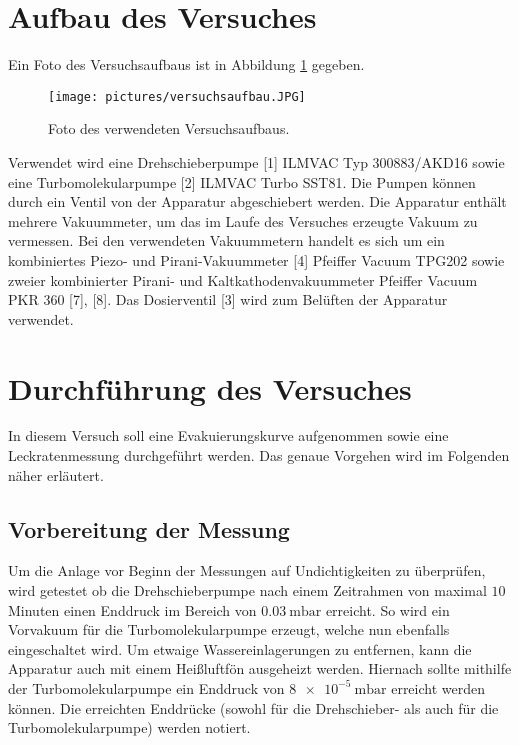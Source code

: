 \section{Aufbau des Versuches}
\label{sec:aufbau}
Ein Foto des Versuchsaufbaus ist in Abbildung \ref{fig:versuchsaufbau} gegeben.
\begin{figure}[H]
  \centering
  \caption{Foto des verwendeten Versuchsaufbaus.}
  \label{fig:versuchsaufbau}
  \texttt{[image: pictures/versuchsaufbau.JPG]}
\end{figure}
\noindent
Verwendet wird eine Drehschieberpumpe [1] ILMVAC Typ 300883/AKD16 sowie eine Turbomolekularpumpe [2]
ILMVAC Turbo SST81. Die Pumpen können durch ein Ventil von der Apparatur abgeschiebert werden.
Die Apparatur enthält mehrere Vakuummeter, um das im Laufe des Versuches erzeugte Vakuum zu vermessen.
Bei den verwendeten Vakuummetern handelt es sich um ein kombiniertes
Piezo- und Pirani-Vakuummeter [4] Pfeiffer Vacuum TPG202 sowie zweier kombinierter Pirani- und Kaltkathodenvakuummeter
Pfeiffer Vacuum PKR 360 [7], [8]. Das Dosierventil [3] wird zum Belüften der Apparatur verwendet.

\section{Durchführung des Versuches}
\label{sec:Durchführung}
In diesem Versuch soll eine Evakuierungskurve aufgenommen sowie eine Leckratenmessung
durchgeführt werden. Das genaue Vorgehen wird im Folgenden näher erläutert.

\subsection{Vorbereitung der Messung}
\label{subsec:vorbereitung}
Um die Anlage vor Beginn der Messungen auf Undichtigkeiten zu überprüfen, wird getestet
ob die Drehschieberpumpe nach einem Zeitrahmen von maximal $\num{10}$ Minuten einen Enddruck
im Bereich von $\SI{0.03}{\milli\bar}$ erreicht. So wird ein Vorvakuum für die Turbomolekularpumpe
erzeugt, welche nun ebenfalls eingeschaltet wird. Um etwaige Wassereinlagerungen zu entfernen,
kann die Apparatur auch mit einem Heißluftfön ausgeheizt werden. Hiernach sollte mithilfe
der Turbomolekularpumpe ein Enddruck von $\SI{8e-5}{\milli\bar}$ erreicht werden können.
Die erreichten Enddrücke (sowohl für die Drehschieber- als auch für die Turbomolekularpumpe)
werden notiert.

